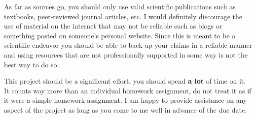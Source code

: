 \documentclass[12pt]{article}
\begin{document}
As far as sources go, you should only use valid scientific publications such as textbooks, peer-reviewed journal articles, etc.  I would definitely discourage the use of material on the internet that may not be reliable such as blogs or something posted on someone's personal website. Since this is meant to be a scientific endeavor you should be able to back up your claims in a reliable manner and using resources that are not professionally supported in some way is not the best way to do so.

This project should be a significant effort, you should spend {\bf a lot} of time on it. It counts way more than an individual homework assignment, do not treat it as if it were a simple homework assignment. I am happy to provide assistance on any aspect of the project as long as you come to me well in advance of the due date.
\end{document}
